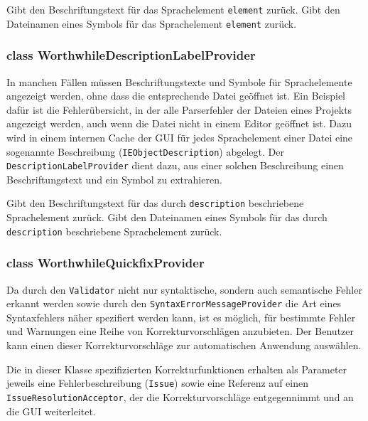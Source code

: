 \begin{description}
	 Gibt den Beschriftungstext für das Sprachelement \texttt{element} zurück.
	 Gibt den Dateinamen eines Symbols für das Sprachelement \texttt{element} zurück.
\end{description}

\subsubsection{class WorthwhileDescriptionLabelProvider}

In manchen Fällen müssen Beschriftungstexte und Symbole für Sprachelemente angezeigt werden, ohne dass die entsprechende Datei geöffnet ist. Ein Beispiel dafür ist die Fehlerübersicht, in der alle Parserfehler der Dateien eines Projekts angezeigt werden, auch wenn die Datei nicht in einem Editor geöffnet ist. Dazu wird in einem internen Cache der GUI für jedes Sprachelement einer Datei eine sogenannte Beschreibung (\texttt{IEObjectDescription}) abgelegt. Der \texttt{DescriptionLabelProvider} dient dazu, aus einer solchen Beschreibung einen Beschriftungstext und ein Symbol zu extrahieren.

\begin{description}
	 Gibt den Beschriftungstext für das durch \texttt{description} beschriebene Sprachelement zurück.
	 Gibt den Dateinamen eines Symbols für das durch \texttt{description} beschriebene Sprachelement zurück.
\end{description}

\subsubsection{class WorthwhileQuickfixProvider}

Da durch den \texttt{Validator} nicht nur syntaktische, sondern auch semantische Fehler erkannt werden sowie durch den \texttt{SyntaxErrorMessageProvider} die Art eines Syntaxfehlers näher spezifiert werden kann, ist es möglich, für bestimmte Fehler und Warnungen eine Reihe von Korrekturvorschlägen anzubieten. Der Benutzer kann einen dieser Korrekturvorschläge zur automatischen Anwendung auswählen.

Die in dieser Klasse spezifizierten Korrekturfunktionen erhalten als Parameter jeweils eine Fehlerbeschreibung (\texttt{Issue}) sowie eine Referenz auf einen \texttt{IssueResolutionAcceptor}, der die Korrekturvorschläge entgegennimmt und an die GUI weiterleitet.

